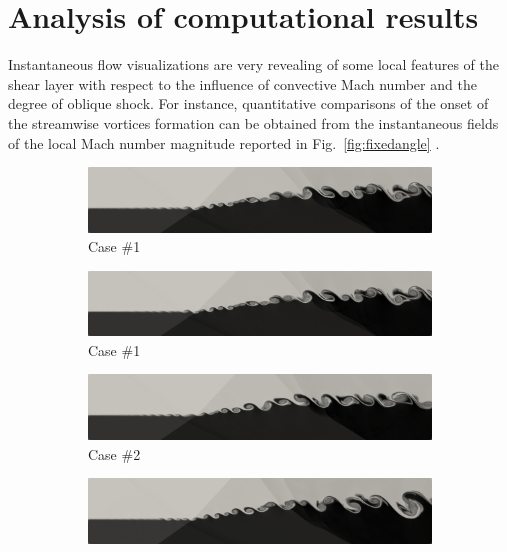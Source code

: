 \documentclass[conf]{new-aiaa}
\begin{document}
\section{Analysis of computational results}
\label{sec:results_and_discussion}
Instantaneous flow visualizations are very revealing of some local features of the shear layer with respect to the influence of convective Mach number and the degree of oblique shock.
%
For instance, quantitative comparisons of the onset of the streamwise vortices formation can be obtained from the instantaneous fields of the local Mach number magnitude reported in Fig.~\ref{fig:fixedangle} .
%
\begin{figure}[!ht]
\centering
\begin{subfigure}{.48\textwidth}
\includegraphics[width=0.99\columnwidth]{figs/mach-1-crop.png}
\caption{Case \#1}
\label{fig:mach1}
\end{subfigure}
\begin{subfigure}{.48\textwidth}
\includegraphics[width=0.99\columnwidth]{figs/mach-1-crop.png}
\caption{Case \#1}
\label{fig:mach6}
\end{subfigure}
\begin{subfigure}{.48\textwidth}
\includegraphics[width=0.99\columnwidth]{figs/mach-2-crop.png}
\caption{Case \#2}
\label{fig:mach2}
\end{subfigure}
\begin{subfigure}{.48\textwidth}
\includegraphics[width=0.99\columnwidth]{figs/mach-6-crop.png}

\end{subfigure}
\end{figure}
\end{document}
